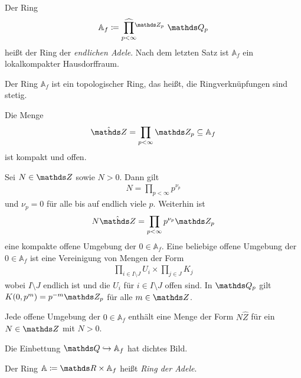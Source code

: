 \begin{defi}
Der Ring
\begin{align*}
\mathbb{A}_f \coloneqq \Product\limits_{p<\infty}\hspace{-4pt}\vphantom{\prod}^{\Z_p}~ \Q_p
\end{align*}
heißt der Ring der \emph{endlichen Adele}.
Nach dem letzten Satz ist $\mathbb{A}_f$ ein lokalkompakter Hausdorffraum.
\end{defi}

 
\begin{prop}
Der Ring $\mathbb{A}_f$ ist ein topologischer Ring, das heißt, die Ringverknüpfungen sind stetig.
\end{prop}

\begin{prop}
Die Menge
\begin{align*}
\hat{\Z}=\prod_{p <\infty} \Z_p \subseteq \mathbb{A}_f
\end{align*}
ist kompakt und offen.
\end{prop}

Sei $N\in \Z$ sowie $N>0$. Dann gilt
\begin{align*}
N=\prod_{p<\infty} p^{\nu_p}
\end{align*}
und $\nu_p=0$ für alle bis auf endlich viele $p$.
Weiterhin ist
\begin{align*}
N \hat{\Z}=\prod_{p <\infty} p^{\nu_p}\Z_p
\end{align*}
eine kompakte offene Umgebung der $0 \in \mathbb{A}_f$.
Eine beliebige offene Umgebung der $0 \in \mathbb{A}_f$ ist eine Vereinigung von Mengen der Form
\begin{align*}
\prod_{i \in I\setminus J} U_i \times \prod_{j \in J} K_j
\end{align*}
wobei $I\setminus J$ endlich ist und die $U_i$ für $i \in I \setminus J$ offen sind.
In $\Q_p$ gilt $K(0,p^m)=p^{-m}\Z_p$ für alle $m \in \Z$.

\begin{prop}
Jede offene Umgebung der $0\in \mathbb{A}_f$ enthält eine Menge der Form $N \hat{Z}$ für ein $N \in \Z$ mit $N>0$.
\end{prop}

\begin{prop}
Die Einbettung $\Q \hookrightarrow \mathbb{A}_f$ hat dichtes Bild.
\end{prop}

\begin{defi}
Der Ring $\mathbb{A} \coloneqq \R \times \mathbb{A}_f$ heißt \emph{Ring der Adele}.
\end{defi}


